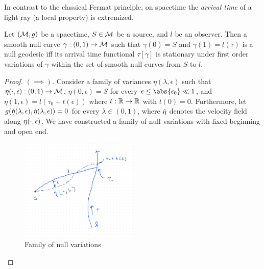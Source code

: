 In contrast to the classical Fermat principle, on spacetime the \textit{arrival time} of a light ray (a local property) is extremized.
\begin{theorem}\label{}
Let $(\mathcal{M}, g)$ be a spacetime, $S \in \mathcal{M}$ be a source, and $l$ be an observer. Then a smooth null curve $\gamma: (0,1) \to \mathcal{M}$ such that $\gamma(0) = S$ and $\gamma(1) = l(\tau)$ is a null geodesic iff its arrival time functional $\tau[\gamma]$ is stationary under first order variations of $\gamma$ within the set of smooth null curves from $S$ to $l$.
\end{theorem}
\begin{proof}
$(\implies)$. Consider a family of variances $\eta(\lambda, \epsilon)$ such that $\eta(\cdot, \epsilon) : (0,1) \to \mathcal{M}$, $\eta(0, \epsilon) = S$ for every $\eps \le \abs{\eps_0} \ll 1$, and $\eta(1, \epsilon) = l(\tau_0 + t(\epsilon))$ where $t: \mathbb{R} \to \mathbb{R}$ with $t(0)=0$.
Furthermore, let $g(\dot{\eta}(\lambda, \epsilon), \dot{\eta}(\lambda, \epsilon)) = 0$ for every $\lambda \in (0,1)$, where $\dot{\eta}$ denotes the velocity field along $\eta(\cdot, \epsilon)$. We have constructed a family of null variations with fixed beginning and open end.
%
\begin{figure}[!htb]
	\centering
	\includegraphics[width=0.5\textwidth]{img/null-variations.png}
	\caption{Family of null variations}
	\label{}
\end{figure}


\end{proof}
